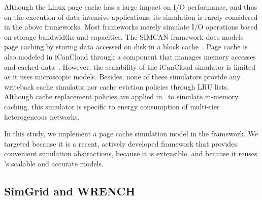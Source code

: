 Although the Linux page cache has a large impact on I/O
performance, and thus on the execution of data-intensive
applications, its simulation is rarely considered in the above
frameworks.  Most frameworks merely simulate I/O operations
based on storage bandwidths and capacities.  The SIMCAN
framework does models page caching by storing data accessed on
disk in a block cache~\cite{nunez2012simcan}.  Page cache is
also modeled in iCanCloud through a component that manages
memory accesses and cached data~\cite{nunez2012icancloud}.
However, the scalability of the iCanCloud simulator is limited
as it uses microscopic models.  Besides, none
of these simulators provide any writeback cache simulator nor
cache eviction policies through LRU lists.  Although cache
replacement policies are applied in~\cite{xu2018saving} to
simulate in-memory caching, this simulator is specific to
energy consumption of multi-tier heterogeneous networks.

In this study, we implement a page cache simulation model in the
\wrench framework. We targeted \wrench because it is a recent,
actively developed framework that provides convenient simulation
abstractions, because it is extensible, and because it reuses
\simgrid's scalable and accurate models.

\subsection{SimGrid and WRENCH}
